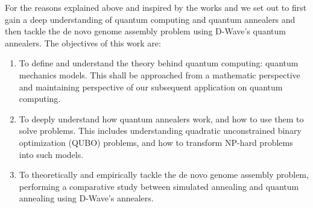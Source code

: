 For the reasons explained above and inspired by the works \cite{Sohn2018} and \cite{Sarkar2020}  we set out to first gain a deep understanding of quantum computing and quantum annealers and then tackle the de novo genome assembly problem using D-Wave's quantum annealers. The objectives of this work are:

\begin{enumerate}
	\item To define and understand the theory behind quantum computing: quantum mechanics models. This shall be approached from a mathematic perspective and maintaining perspective of our subsequent application on quantum computing.
	\item To deeply understand how quantum annealers work, and how to use them to solve problems. This includes understanding quadratic unconstrained binary optimization (QUBO) problems, and how to transform NP-hard problems into such models.
	\item To theoretically and empirically tackle the de novo genome assembly problem, performing a comparative study between simulated annealing and quantum annealing using D-Wave's annealers.
\end{enumerate}

